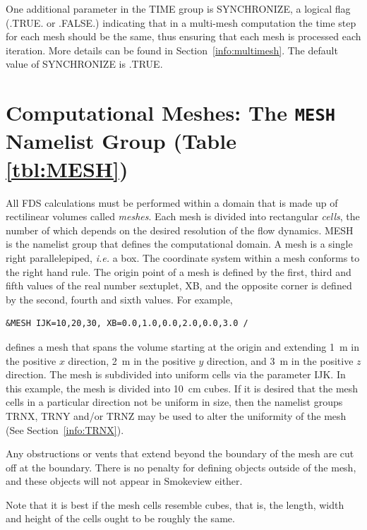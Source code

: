 \documentclass[11pt]{book}
\begin{document}
\noindent
One additional parameter in the {\ct TIME} group is {\ct SYNCHRONIZE}, a
logical flag ({\ct .TRUE.} or {\ct .FALSE.}) indicating that in a
multi-mesh computation the time step for each mesh should be the same, thus
ensuring that each mesh is processed each iteration. More details can
be found in Section~\ref{info:multimesh}. The default value of {\ct SYNCHRONIZE} is {\ct .TRUE.}

\newpage

\section{Computational Meshes: The \texorpdfstring{{\tt MESH}}{MESH} Namelist Group (Table \ref{tbl:MESH})}
\label{info:MESH}

All FDS calculations must be performed within a domain that is made up
of rectilinear volumes called {\em meshes}. Each mesh is divided into rectangular {\em cells},
the number of which depends on the desired resolution of the flow dynamics.
{\ct MESH} is the namelist group that defines the computational domain.
A mesh is a single right parallelepiped, {\em i.e.} a box.
The coordinate system within a mesh conforms to the right hand rule.
The origin point of a mesh is defined by the first, third
and fifth values of the real number sextuplet, {\ct XB}, and the opposite
corner is defined by the second, fourth and sixth values.
For example,

\footnotesize
\begin{verbatim}
&MESH IJK=10,20,30, XB=0.0,1.0,0.0,2.0,0.0,3.0 /
\end{verbatim}

\normalsize
\noindent
defines a mesh that spans the volume starting at the origin and extending 1~m in the positive
$x$ direction, 2~m in the positive $y$ direction, and 3~m in the positive $z$ direction.
The mesh is subdivided into uniform cells via the parameter
{\ct IJK}. In this example, the mesh is divided into 10~cm cubes.
If it is desired that the mesh cells in a particular direction not be uniform in size,
then the namelist groups {\ct TRNX}, {\ct TRNY} and/or {\ct TRNZ} may be used to alter the
uniformity of the mesh (See Section~\ref{info:TRNX}).

Any obstructions or vents that extend beyond the boundary of the mesh
are cut off at the boundary. There is no penalty for defining objects
outside of the mesh, and these objects will not appear in Smokeview either.

\begin{warning}
\noindent
Note that it is best if the mesh cells resemble cubes, that is, the
length, width and height of the cells ought to be roughly the same.
\end{warning}
\end{document}
